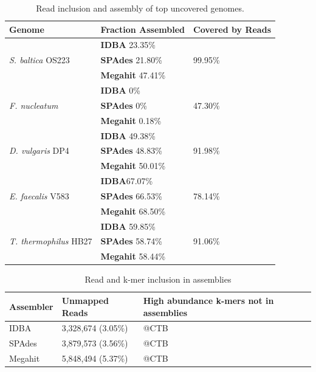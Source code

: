 \documentclass[10pt,a4paper,twocolumn]{article}
\begin{document}
\begin{table}[!h]
\centering
\caption{Read inclusion and assembly of top uncovered genomes.}
\begin{tabular}{|p{3cm}|p{2.5cm}|p{1.11cm}|}\hline
\textbf{Genome} & \textbf{Fraction Assembled} & \textbf {Covered by Reads} \\ \hline 
\multirow{3}{*}{{\em S. baltica} OS223 }&\textbf{IDBA} 23.35\%   &\multirow{3}{*}{99.95\%}\\  
&\textbf{SPAdes } 21.80\% & \\  
&\textbf{Megahit} 47.41\% & \\ \hline
\multirow{3}{*}{{\em F. nucleatum}}  &\textbf{IDBA} 0\%&\multirow{3}{*}{47.30\%} \\ 
&\textbf{SPAdes} 0\%& \\
&\textbf{Megahit} 0.18\%& \\ \hline
\multirow{3}{*}{{\em D. vulgaris} DP4}  &\textbf{IDBA} 49.38\%  &\multirow{3}{*}{91.98\%}\\  
&\textbf{SPAdes} 48.83\% & \\ 
&\textbf{Megahit} 50.01\% & \\ \hline 
\multirow{3}{*}{{\em E. faecalis} V583}  &\textbf{IDBA}67.07\%&\multirow{3}{*}{78.14\%} \\  
&\textbf{SPAdes} 66.53\% & \\
&\textbf{Megahit} 68.50\% & \\ \hline
\multirow{3}{*}{{\em T. thermophilus} HB27}  &\textbf{IDBA} 59.85\% &\multirow{3}{*}{91.06\%}\\  
&\textbf{SPAdes} 58.74\% & \\ 
&\textbf{Megahit} 58.44\%& \\ \hline
\end{tabular}
\label{table:genomes_uncovered-analysis}
\end{table}





\begin{table}[!h]
\centering
\caption{Read and k-mer inclusion in assemblies}
\begin{tabular}{|p{1.5cm}|p{1.5cm}|p{2.5cm}|}\hline
\textbf{Assembler} & \textbf{Unmapped Reads} & \textbf {High abundance k-mers not in assemblies} \\ \hline 
IDBA &3,328,674 (3.05\%)&  @CTB \\ \hline
SPAdes &3,879,573 (3.56\%) &  @CTB \\ \hline
Megahit &5,848,494 (5.37\%) &   @CTB \\ \hline
\end{tabular}
\label{table:reads-kmers}
\end{table}
\end{document}
